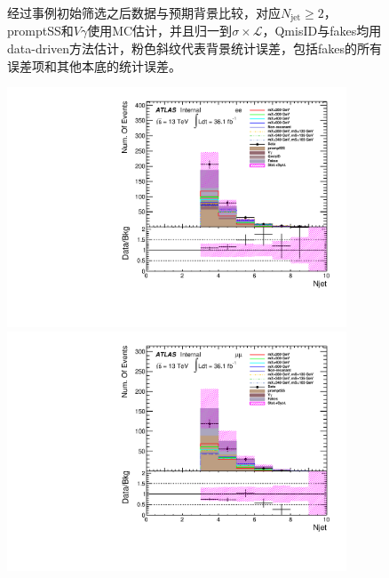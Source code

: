 \begin{figure}[h]
\begin{minipage}[t]{0.33\linewidth}
\end{minipage}
\caption{经过事例初始筛选之后数据与预期背景比较，对应$N_{\text{jet}}\geq2$，promptSS和$V\gamma$使用MC估计，并且归一到$\sigma\times\mathcal{L}$，QmisID与fakes均用data-driven方法估计，粉色斜纹代表背景统计误差，包括fakes的所有误差项和其他本底的统计误差。}
\label{fig:dataMC_low_Njet_CR:numOfjet}
\end{figure}

\begin{figure}[h]
\begin{minipage}[t]{0.33\linewidth}
\centering
\includegraphics[width=0.9\textwidth,angle=-90]{fig/dataMC_high_Njet_CR/numOfjet_ee.pdf}
\end{minipage}
\begin{minipage}[t]{0.33\linewidth}
\centering
\includegraphics[width=0.9\textwidth,angle=-90]{fig/dataMC_high_Njet_CR/numOfjet_mumu.pdf}

\end{minipage}
\end{figure}
